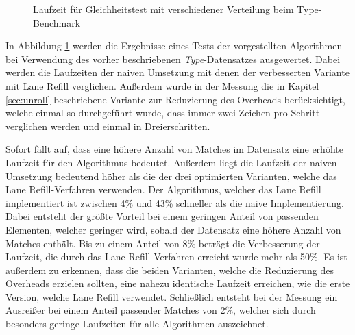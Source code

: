 \begin{figure}[ht]
	\centering
	\caption{Laufzeit für Gleichheitstest mit verschiedener Verteilung beim Type-Benchmark}
	\label{fig:type_equals}
\end{figure}

In Abbildung \ref{fig:type_equals} werden die Ergebnisse eines Tests der vorgestellten Algorithmen bei Verwendung des vorher beschriebenen \emph{Type}-Datensatzes ausgewertet.
Dabei werden die Laufzeiten der naiven Umsetzung mit denen der verbesserten Variante mit Lane Refill verglichen.
Außerdem wurde in der Messung die in Kapitel \ref{sec:unroll} beschriebene Variante zur Reduzierung des Overheads berücksichtigt, welche einmal so durchgeführt wurde, dass immer zwei Zeichen pro Schritt verglichen werden und einmal in Dreierschritten.

Sofort fällt auf, dass eine höhere Anzahl von Matches im Datensatz eine erhöhte Laufzeit für den Algorithmus bedeutet.
Außerdem liegt die Laufzeit der naiven Umsetzung bedeutend höher als die der drei optimierten Varianten, welche das Lane Refill-Verfahren verwenden.
Der Algorithmus, welcher das Lane Refill implementiert ist zwischen 4\% und 43\% schneller als die naive Implementierung.
Dabei entsteht der größte Vorteil bei einem geringen Anteil von passenden Elementen, welcher geringer wird, sobald der Datensatz eine höhere Anzahl von Matches enthält.
Bis zu einem Anteil von 8\% beträgt die Verbesserung der Laufzeit, die durch das Lane Refill-Verfahren erreicht wurde mehr als 50\%.
Es ist außerdem zu erkennen, dass die beiden Varianten, welche die Reduzierung des Overheads erzielen sollten, eine nahezu identische Laufzeit erreichen, wie die erste Version, welche Lane Refill verwendet.
Schließlich entsteht bei der Messung ein Ausreißer bei einem Anteil passender Matches von 2\%, welcher sich durch besonders geringe Laufzeiten für alle Algorithmen auszeichnet.

